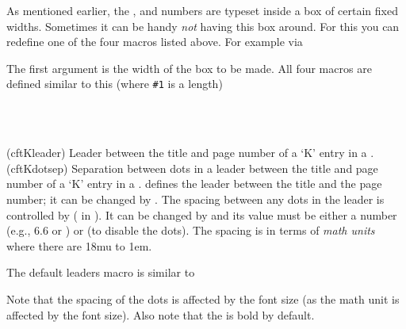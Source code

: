 As mentioned earlier, the \cmd{\book}, \cmd{\part} and \cmd{\chapter}
numbers are typeset inside a box of certain fixed widths. Sometimes it
can be handy \emph{not} having this box around. For this you can
redefine one of the four  macros listed
above. For example via
\begin{lcode}
  \renewcommand\chapternumberlinebox[2]{#2}
\end{lcode}
The first argument is the width of the box to be made.  All four
macros are defined similar to this (where \texttt{\#1} is a length)
\begin{lcode}
\newcommand\chapternumberlinebox[2]{%
  \hb@xt@#1{#2\hfil}}
\end{lcode}


\begin{comment}
\Note{}  Because the \Lpack{hyperref} package~\cite{HYPERREF} 
does not understand
the \cmd{\partnumberline} and \cmd{\chapternumberline} commands,
if you use the \Lpack{hyperref} package you will also have to use
the \Lpack{memhfixc} package, which comes with memoir.
\end{comment}


\begin{syntax}
\cmd{\cftKleader} \\
\cmd{\cftKdotsep} \\
\end{syntax}
\glossary(cftKleader)
  {}%
  {Leader between the title and page number of a `K' entry in a \listofx.} 
\glossary(cftKdotsep)
  {}%
  {Separation between dots in a leader between the title and page number of a `K' entry in a \listofx.} 
 \cmd{\cftKleader} defines the leader between the title and the page number;
 it can be changed by \cmd{\renewcommand}.
 The spacing between any dots in the leader is controlled by \cmd{\cftKdotsep} 
 (\cmd{\@dotsep} in ).
 It can be changed by \cmd{\renewcommand} and its value must be either a
 number (e.g., 6.6 or \cmd{\cftdotsep}) or \cmd{\cftnodots} (to
 disable the dots). The spacing is in terms of \emph{math units} where
 there are 18mu to 1em. 

The default leaders macro is similar to
\begin{lcode}
  \newcommand{\cftsectionleader}{\normalfont\cftdotfill{\cftsectiondotsep}}
\end{lcode}
Note that the spacing of the dots is affected by the font size (as the
math unit is affected by the font size). Also note that the
\cmd{\cftchapterleader} is bold by default.

